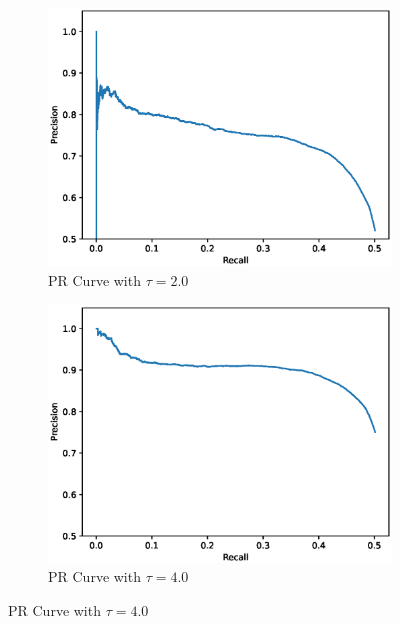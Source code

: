 \documentclass[letter]{article}
\begin{document}
	\begin{figure}[!h]
		\centering
		\begin{subfigure}[t]{0.4\textwidth}
			\centering
			\includegraphics[width=\linewidth]{images/plot_tau_2_focal.eps}
			\caption{PR Curve with $\tau=2.0$}
		\end{subfigure}
		\begin{subfigure}[t]{0.4\textwidth}
			\centering
			\includegraphics[width=\linewidth]{images/plot_tau_4_focal.eps}
			\caption{PR Curve with $\tau=4.0$}
		\end{subfigure}
		\vspace*{1mm}
	  

\end{figure}
\end{document}
